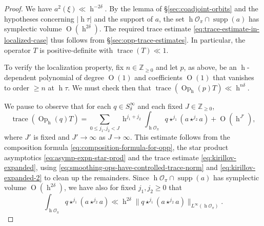 \documentclass[reqno,10pt]{amsart}
\theoremstyle{plain} %
\theoremstyle{definition}
\theoremstyle{plain} %
\theoremstyle{remark}
\theoremstyle{itplain} %
\theoremstyle{remark} %
\renewcommand{\geq}{\geqslant}
\renewcommand{\leq}{\leqslant}
\numberwithin{equation}{section}
\DeclareMathOperator{\trace}{trace}
\def\O{\operatorname{O}}
\DeclareMathOperator{\Opp}{Op}
\DeclareMathOperator{\supp}{supp}
\DeclareMathOperator{\h}{h}
\begin{document}
\begin{proof}
  We have $a^2(\xi) \ll \h^{-2 \delta}$.  By the lemma of \S\ref{sec:coadjoint-orbits} and the hypotheses concerning $|\h \tau|$ and the support of $a$, the set $\h \mathcal{O}_\pi \cap \supp(a)$ has symplectic volume $\O(\h^{2 \delta})$.  The required trace estimate \eqref{eq:trace-estimate-in-localized-case} thus follows from \S\ref{sec:opp-trace-estimates}.  In particular, the operator $T$ is positive-definite with $\trace(T) \ll 1$.

  To verify the localization property, fix $n \in \mathbb{Z}_{\geq 0}$ and let $p$, as above, be an $\h$-dependent polynomial of degree $\O(1)$ and coefficients $\O(1)$ that vanishes to order $\geq n$ at $\h \tau$.  We must check then that $\trace(\Opp_{\h}(p) T) \ll \h^{n \delta}$.
  
  We pause to observe that for each $q \in S^{\infty}_\delta$ and each fixed $J \in \mathbb{Z}_{\geq 0}$,
  \begin{equation}\label{eq:trace-opp-q-T}
    \trace(\Opp_{\h}(q) T )
    =
    \sum_{0 \leq j_1, j_2 < J}
    \h^{j_1 + j_2}
    \int_{\h \mathcal{O}_\pi}
    q \star^{j_1} (a \star^{j_2} a)
    + \O(\h^{J'}),
  \end{equation}
  where $J'$ is fixed and $J' \rightarrow \infty$ as $J \rightarrow \infty$.  This estimate follows from the composition formula \eqref{eq:composition-formula-for-opp}, the star product asymptotics \eqref{eq:asymp-expn-star-prod} and the trace estimate \eqref{eq:kirillov-expanded}, using \eqref{eq:smoothing-ops-have-controlled-trace-norm} and \eqref{eq:kirillov-expanded-2} to clean up the remainders.  Since $\h \mathcal{O}_\pi \cap \supp(a)$ has symplectic volume $\O(\h^{2 \delta})$, we have also for fixed $j_1, j_2 \geq 0$ that
  \begin{equation*}
    \int_{\h \mathcal{O}_\pi}
    q \star^{j_1} (a \star^{j_2} a)
    \ll
    \h^{2 \delta}
    \|q \star^{j_1} (a \star^{j_2} a)\|_{L^\infty(\h \mathcal{O}_\pi)}.
  \end{equation*}


\end{proof}
\end{document}
